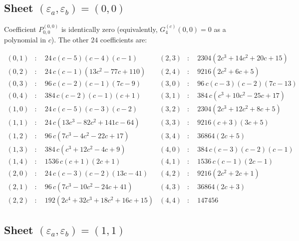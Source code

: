 \documentclass[11pt]{article}
\begin{document}
\subsection{Sheet $(\varepsilon_a, \varepsilon_b) = (0, 0)$}

Coefficient $P^{(0,0)}_{0,0}$ is identically zero (equivalently, $G_4^{(c)}(0,0) = 0$ as a
polynomial in $c$). The other $24$ coefficients are:

\begin{small}
\begin{align*}
(0,1)&: \quad 24\,c(c{-}5)(c{-}4)(c{-}1) & (2,3)&: \quad 2304(2c^3 + 14c^2 + 20c + 15)\\
(0,2)&: \quad 24\,c(c{-}1)(13c^2 - 77c + 110) & (2,4)&: \quad 9216(2c^2 + 6c + 5)\\
(0,3)&: \quad 96\,c(c{-}2)(c{-}1)(7c - 9) & (3,0)&: \quad 96\,c(c{-}3)(c{-}2)(7c - 13)\\
(0,4)&: \quad 384\,c(c{-}2)(c{-}1)(c{+}1) & (3,1)&: \quad 384\,c(c^3 + 10c^2 - 25c + 17)\\
(1,0)&: \quad 24\,c(c{-}5)(c{-}3)(c{-}2) & (3,2)&: \quad 2304(2c^3 + 12c^2 + 8c + 5)\\
(1,1)&: \quad 24\,c(13c^3 - 82c^2 + 141c - 64) & (3,3)&: \quad 9216(c{+}3)(3c + 5)\\
(1,2)&: \quad 96\,c(7c^3 - 4c^2 - 22c + 17) & (3,4)&: \quad 36864(2c + 5)\\
(1,3)&: \quad 384\,c(c^3 + 12c^2 - 4c + 9) & (4,0)&: \quad 384\,c(c{-}3)(c{-}2)(c{-}1)\\
(1,4)&: \quad 1536\,c(c{+}1)(2c + 1) & (4,1)&: \quad 1536\,c(c{-}1)(2c - 1)\\
(2,0)&: \quad 24\,c(c{-}3)(c{-}2)(13c - 41) & (4,2)&: \quad 9216(2c^2 + 2c + 1)\\
(2,1)&: \quad 96\,c(7c^3 - 10c^2 - 24c + 41) & (4,3)&: \quad 36864(2c + 3)\\
(2,2)&: \quad 192(2c^4 + 32c^3 + 18c^2 + 16c + 15) & (4,4)&: \quad 147456
\end{align*}
\end{small}

\subsection{Sheet $(\varepsilon_a, \varepsilon_b) = (1, 1)$}
\end{document}
